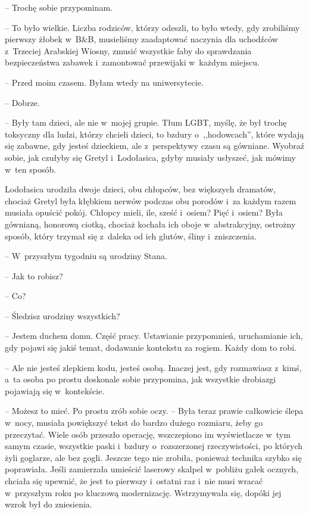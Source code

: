 \documentclass[oneside,polish,11pt,sfheadings]{mwbk}
\begin{document}
-- Trochę sobie przypominam.

-- To było wielkie. Liczba rodziców, którzy odeszli, to było wtedy, gdy
zrobiliśmy pierwszy żłobek w~B\&B, musieliśmy zaadaptować naczynia dla
uchodźców z~Trzeciej Arabskiej Wiosny, zmusić wszystkie faby do
sprawdzania bezpieczeństwa zabawek i~zamontować przewijaki w~każdym
miejscu.

-- Przed moim czasem. Byłam wtedy na uniwersytecie.

-- Dobrze.

-- Były tam dzieci, ale nie w~mojej grupie. Tłum LGBT, myślę, że był
trochę toksyczny dla ludzi, którzy chcieli dzieci, to bzdury o~,,hodowcach'', które wydają się zabawne, gdy jesteś dzieckiem, ale z~perspektywy czasu są gówniane. Wyobraź sobie, jak czułyby się Gretyl i~Lodołasica, gdyby musiały usłyszeć, jak mówimy w~ten sposób.

Lodołasica urodziła dwoje dzieci, obu chłopców, bez większych dramatów,
chociaż Gretyl była kłębkiem nerwów podczas obu porodów i~za każdym
razem musiała opuścić pokój. Chłopcy mieli, ile, sześć i~osiem? Pięć i~osiem? Była gównianą, honorową ciotką, chociaż kochała ich oboje w~abstrakcyjny, ostrożny sposób, który trzymał się z~daleka od ich glutów,
śliny i~zniszczenia.

-- W~przyszłym tygodniu są urodziny Stana.

-- Jak to robisz?

-- Co?

-- Śledzisz urodziny wszystkich?

-- Jestem duchem domu. Część pracy. Ustawianie przypomnień, uruchamianie
ich, gdy pojawi się jakiś temat, dodawanie kontekstu za rogiem. Każdy
dom to robi.

-- Ale nie jesteś zlepkiem kodu, jesteś osobą. Inaczej jest, gdy
rozmawiasz z~kimś, a~ta osoba po prostu doskonale sobie przypomina, jak
wszystkie drobiazgi pojawiają się w~kontekście.

-- Możesz to mieć. Po prostu zrób sobie oczy. -- Była teraz prawie
całkowicie ślepa w~nocy, musiała powiększyć tekst do bardzo dużego
rozmiaru, żeby go przeczytać. Wiele osób przeszło operację, wszczepiono
im wyświetlacze w~tym samym czasie, wszystkie paski i~bzdury o~rozszerzonej rzeczywistości, po których żyli goglarze, ale bez gogli.
Jeszcze tego nie zrobiła, ponieważ technika szybko się poprawiała. Jeśli
zamierzała umieścić laserowy skalpel w~pobliżu gałek ocznych, chciała
się upewnić, że jest to pierwszy i~ostatni raz i~nie musi wracać w~przyszłym roku po kluczową modernizację. Wstrzymywała się, dopóki jej
wzrok był do zniesienia. 
\end{document}
